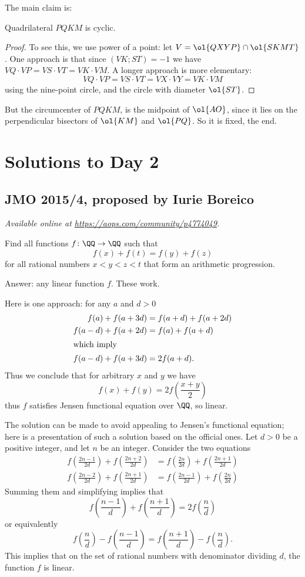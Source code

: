 \documentclass[11pt]{scrartcl}
\begin{document}
The main claim is:
\begin{claim*}
  Quadrilateral $PQKM$ is cyclic.
\end{claim*}
\begin{proof}
  To see this, we use power of a point: let $V = \ol{QXYP} \cap \ol{SKMT}$.
  One approach is that since $(VK;ST) = -1$
  we have $VQ \cdot VP = VS \cdot VT = VK \cdot VM$.
  A longer approach is more elementary:
  \[ VQ \cdot VP = VS \cdot VT = VX \cdot VY = VK \cdot VM \]
  using the nine-point circle, and the circle with diameter $\ol{ST}$.
\end{proof}
But the circumcenter of $PQKM$,
is the midpoint of $\ol{AO}$,
since it lies on the perpendicular bisectors of $\ol{KM}$ and $\ol{PQ}$.
So it is fixed, the end.
\pagebreak

\section{Solutions to Day 2}
\subsection{JMO 2015/4, proposed by Iurie Boreico}
\textsl{Available online at \url{https://aops.com/community/p4774049}.}
\begin{mdframed}[style=mdpurplebox,frametitle={Problem statement}]
Find all functions $f \colon \QQ \to \QQ$ such that
\[ f(x)+f(t)=f(y)+f(z) \]
for all rational numbers $x<y<z<t$ that form an arithmetic progression.
\end{mdframed}
Answer: any linear function $f$.
These work.

Here is one approach: for any $a$ and $d > 0$
\begin{align*}
  f(a) + f(a+3d) &= f(a+d) + f(a+2d) \\
  f(a-d) + f(a+2d) &= f(a) + f(a+d) \\
  \intertext{which imply}
  f(a-d) + f(a+3d) &= 2f(a+d).
\end{align*}
Thus we conclude that for arbitrary $x$ and $y$ we have
\[ f(x) + f(y) = 2f\left( \frac{x+y}{2} \right) \]
thus $f$ satisfies Jensen functional equation over $\QQ$, so linear.

The solution can be made to avoid appealing to Jensen's functional equation;
here is a presentation of such a solution based on the official ones.
Let $d > 0$ be a positive integer, and let $n$ be an integer.
Consider the two equations
\begin{align*}
  f\left( \frac{2n-1}{2d} \right) + f\left( \frac{2n+2}{2d} \right)
  &= f\left( \frac{2n}{2d} \right) + f\left( \frac{2n+1}{2d} \right) \\
  f\left( \frac{2n-2}{2d} \right) + f\left( \frac{2n+1}{2d} \right)
  &= f\left( \frac{2n-1}{2d} \right) + f\left( \frac{2n}{2d} \right)
\end{align*}
Summing them and simplifying implies that
\[ f\left( \frac{n-1}{d} \right) + f\left( \frac{n+1}{d} \right)
  = 2 f \left( \frac nd \right) \]
or equivalently
\[ f\left( \frac nd \right) - f\left( \frac{n-1}{d} \right)
  = f\left( \frac{n+1}{d} \right) - f\left( \frac nd \right). \]
This implies that on the set of rational numbers
with denominator dividing $d$, the function $f$ is linear.
\end{document}
